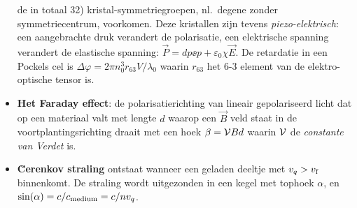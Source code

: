 \begin{itemize}
      de in totaal 32) kristal-symmetriegroepen, nl.\ degene zonder
      symmetriecentrum, voorkomen. Deze kristallen zijn tevens
      {\it piezo-elektrisch}: een aangebrachte druk verandert de polarisatie,
      een elektrische spanning verandert de elastische spanning:
      $\vec{P}=dp\ee{p}+\varepsilon_0\chi\vec{E}$. De retardatie in een
      Pockels cel is $\Delta\varphi=2\pi n_0^3 r_{63}V/\lambda_0$ waarin
      $r_{63}$ het 6-3 element van de elektro-optische tensor is.
\item {\bf Het Faraday effect}: de polarisatierichting van lineair
      gepolariseerd licht dat op een materiaal valt met lengte $d$ waarop een
      $\vec{B}$ veld staat in de voortplantingsrichting draait met een hoek
      $\beta={\cal V}Bd$ waarin $\cal V$ de {\it constante van Verdet} is.
\item {\bf \u{C}erenkov straling} ontstaat wanneer een geladen deeltje met
      $v_q>v_{\rm f}$ binnenkomt. De straling wordt uitgezonden in een kegel
      met tophoek $\alpha$, en $\sin(\alpha)=c/c_{\rm medium}=c/nv_q$.
\end{itemize}

